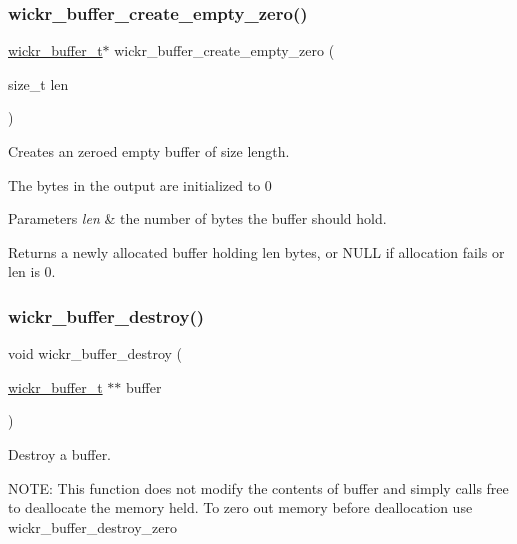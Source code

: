 \subsubsection{\texorpdfstring{wickr\+\_\+buffer\+\_\+create\+\_\+empty\+\_\+zero()}{wickr\_buffer\_create\_empty\_zero()}}
{\footnotesize\ttfamily \hyperlink{structwickr__buffer}{wickr\+\_\+buffer\+\_\+t}$\ast$ wickr\+\_\+buffer\+\_\+create\+\_\+empty\+\_\+zero (\begin{DoxyParamCaption}\item[{size\+\_\+t}]{len }\end{DoxyParamCaption})}



Creates an zeroed empty buffer of size length. 

The bytes in the output are initialized to 0


\begin{DoxyParams}{Parameters}
{\em len} & the number of bytes the buffer should hold. \\
\hline
\end{DoxyParams}
\begin{DoxyReturn}{Returns}
a newly allocated buffer holding len bytes, or N\+U\+LL if allocation fails or len is 0. 
\end{DoxyReturn}
\mbox{\label{group__wickr__buffer_ga7ec1198db0739f3034ddd3969c64257f}} 
\subsubsection{\texorpdfstring{wickr\+\_\+buffer\+\_\+destroy()}{wickr\_buffer\_destroy()}}
{\footnotesize\ttfamily void wickr\+\_\+buffer\+\_\+destroy (\begin{DoxyParamCaption}\item[{\hyperlink{structwickr__buffer}{wickr\+\_\+buffer\+\_\+t} $\ast$$\ast$}]{buffer }\end{DoxyParamCaption})}



Destroy a buffer. 

N\+O\+TE\+: This function does not modify the contents of buffer and simply calls free to deallocate the memory held. To zero out memory before deallocation use \textquotesingle{}wickr\+\_\+buffer\+\_\+destroy\+\_\+zero\textquotesingle{}


